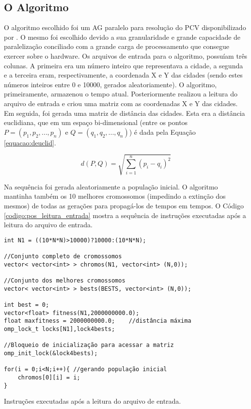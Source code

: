 \subsection{O Algoritmo}
\label{secao:oalgoritmo}

O algoritmo escolhido foi um AG paralelo para resolução do PCV disponibilizado por \citet{arora:2017:travelling}. O mesmo foi escolhido devido a sua granularidade e grande capacidade de paralelização conciliado com a grande carga de processamento que consegue exercer sobre o hardware. Os arquivos de entrada para o algoritmo, possuíam três colunas. A primeira era um número inteiro que representava a cidade, a segunda e a terceira eram, respectivamente, a coordenada X e Y das cidades (sendo estes números inteiros entre 0 e 10000, gerados aleatoriamente). O algoritmo, primeiramente, armazenou o tempo atual. Posteriormente realizou a leitura do arquivo de entrada e criou uma matriz com as coordenadas X e Y das cidades. Em seguida, foi gerada uma matriz de distância das cidades. Esta era a distância euclidiana, que em um espaço bi-dimensional (entre os pontos $P=(p_1,p_2,...,p_n)$ e $Q=(q_1,q_2,...,q_n)$) é dada pela Equação \ref{equacao:deuclid}. 

\begin{equation} \label{equacao:deuclid}
d(P,Q) = \sqrt{\sum_{i=1}^{n}(p_i-q_i)^2}
\end{equation}

Na sequência foi gerada aleatoriamente a população inicial. O algoritmo mantinha também os 10 melhores cromossomos (impedindo a extinção dos mesmos) de todas as gerações para propagá-los de tempos em tempos. O Código \ref{codigo:pos_leitura_entrada} mostra a sequência de instruções executadas após a leitura do arquivo de entrada.

\begin{codigo}[!htb]
	\begin{Verbatim}
int N1 = ((10*N*N)>10000)?10000:(10*N*N);			

//Conjunto completo de cromossomos
vector< vector<int> > chromos(N1, vector<int> (N,0));  

//Conjunto dos melhores cromossomos
vector< vector<int> > bests(BESTS, vector<int> (N,0)); 

int best = 0;
vector<float> fitness(N1,2000000000.0);                
float maxfitness = 2000000000.0;	//distância máxima					
omp_lock_t locks[N1],lock4bests;

//Bloqueio de inicialização para acessar a matriz
omp_init_lock(&lock4bests);	
	
for(i = 0;i<N;i++){	//gerando população inicial
	chromos[0][i] = i;
}
	\end{Verbatim}
	\caption{Instruções executadas após a leitura do arquivo de entrada.} \label{codigo:pos_leitura_entrada}
\end{codigo}

